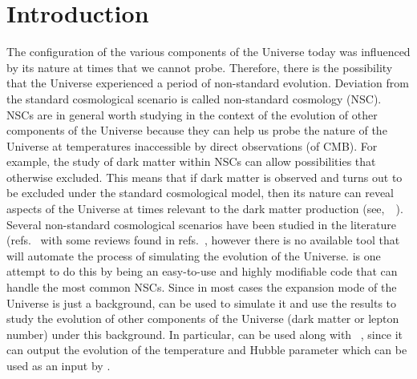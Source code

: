\documentclass[11pt,a4paper]{article}
\begin{document}
\section{Introduction}\label{sec:intro}
\setcounter{equation}{0}
%
The configuration of the various components of the Universe today was influenced by its nature at times that we cannot probe. Therefore, there is the possibility that the Universe experienced a period of non-standard evolution. Deviation from the standard cosmological scenario is called non-standard cosmology (NSC). 
%
NSCs are in general worth studying in the context of the evolution of other components of the Universe because they can help us probe the nature of the Universe at temperatures inaccessible by direct observations (\eg of CMB). For example, the study of dark matter within NSCs can allow possibilities that otherwise excluded. This means that if dark matter is observed and turns out to be excluded under the standard cosmological model, then its nature can reveal aspects of the Universe at times relevant to the dark matter production (see,~\eg~\cite{McDonald:1989jd,DEramo:2017gpl,Redmond:2017tja,DEramo:2017ecx,Bernal:2020bfj,Arias:2020qty,Arias:2021rer,Barman:2021ifu,Dienes:2021woi,Banerjee:2022fiw,Hardy:2018bph,Bernal:2018kcw,Arias:2019uol,Allahverdi:2019jsc,Bernal:2019mhf,Cosme:2020mck}). 
%
Several non-standard cosmological scenarios have been studied in the literature (\eg refs.~\cite{Vilenkin:1982wt,Coughlan:1983ci,Ratra:1987rm,Giudice:2000ex,Gardner:2004in,Dalianis:2018afb} with some reviews found in refs.~\cite{Tsujikawa:2013fta,Allahverdi:2020bys}, however there is no available tool that will automate the process of simulating the evolution of the Universe. \nsc is one attempt to do this by being an easy-to-use and highly modifiable \CPP code that can handle the most common NSCs. 
%
Since in most cases the expansion mode of the Universe is just a background, \nsc can be used to simulate it and use the results to study the evolution of other components of the Universe (\eg dark matter or lepton number) under this background. 
%
In particular, \nsc can be used along with \mimes~\cite{Karamitros:2021nxi}, since it can output the evolution of the temperature and Hubble parameter which can be used as an input by \mimes.
\end{document}

